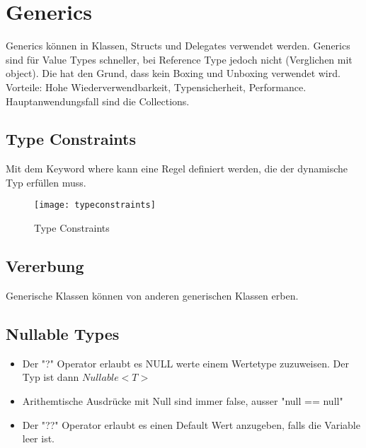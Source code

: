 \section{Generics}
Generics können in Klassen, Structs und Delegates verwendet werden. Generics sind für Value Types schneller, bei Reference Type jedoch nicht (Verglichen mit object). Die hat den Grund, dass kein Boxing und Unboxing verwendet wird. Vorteile: Hohe Wiederverwendbarkeit, Typensicherheit, Performance. Hauptanwendungsfall sind die Collections.

\subsection{Type Constraints}
Mit dem Keyword where kann eine Regel definiert werden, die der dynamische Typ erfüllen muss.
\begin{figure}[h!]
	\centering
  	\texttt{[image: typeconstraints]}
    \caption{Type Constraints}
\end{figure}

\subsection{Vererbung}
 Generische Klassen können von anderen generischen Klassen erben. 
 
 \subsection{Nullable Types}
 \begin{itemize}
  \itemsep -0.5em 
  \item Der "?" Operator erlaubt es NULL werte einem Wertetype zuzuweisen. Der Typ ist dann $Nullable<T>$
  \item Arithemtische Ausdrücke mit Null sind immer false, ausser "null == null"
  \item Der "??" Operator erlaubt es einen Default Wert anzugeben, falls die Variable leer ist.
\end{itemize}

\pagebreak
